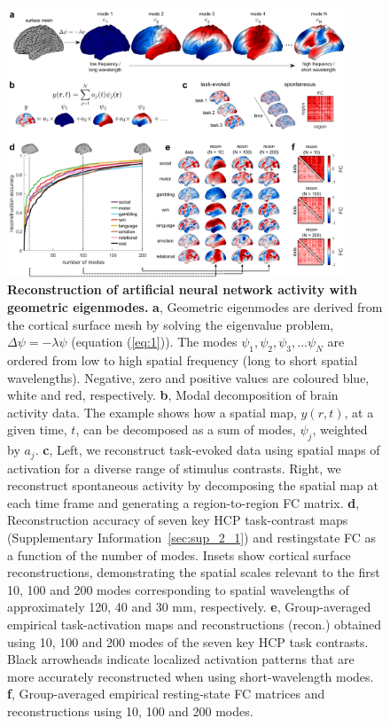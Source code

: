 \documentclass[sn-mathphys-num]{sn-jnl}%
\theoremstyle{thmstyleone}%
\theoremstyle{thmstyletwo}%
\theoremstyle{thmstylethree}%
\begin{document}
\begin{figure}[!htb]
	\centering
	\includegraphics[width=0.9\textwidth]{fig/fig_1.pdf}
	\caption{\textbf{Reconstruction of artificial neural network activity with geometric eigenmodes.}
	\textbf{a}, Geometric eigenmodes are derived from the cortical surface mesh by solving the eigenvalue problem,$ \Delta \psi = -\lambda \psi $ (equation (\ref{eq:1})). 
	The modes $ \psi_1, \psi_2, \psi_3, ... \psi_N $ are ordered from low to high spatial frequency (long to short spatial wavelengths). 
	Negative, zero and positive values are coloured blue, white and red, respectively.
	\textbf{b}, Modal decomposition of brain activity data. 
	The example shows how a spatial map, $ y(r,t) $, at a given time, $ t $, can be decomposed as a sum of modes, $ \psi_j $, weighted by $a_j$.
	\textbf{c}, Left, we reconstruct task-evoked data using spatial maps of activation for a diverse range of stimulus contrasts. 
	Right, we reconstruct spontaneous activity by decomposing the spatial map at each time frame and generating a region-to-region FC matrix.
	\textbf{d}, Reconstruction accuracy of seven key HCP task-contrast maps (Supplementary Information~\ref{sec:sup_2_1}) and restingstate FC as a function of the number of modes. 
	Insets show cortical surface reconstructions, demonstrating the spatial scales relevant to the first 10, 100 and 200 modes corresponding to spatial wavelengths of approximately 120, 40 and 30 mm, respectively.
	\textbf{e}, Group-averaged empirical task-activation maps and reconstructions (recon.) obtained using 10, 100 and 200 modes of the seven key HCP task contrasts. 
	Black arrowheads indicate localized activation patterns that are more accurately reconstructed when using short-wavelength modes. 
	\textbf{f}, Group-averaged empirical resting-state FC matrices and reconstructions using 10, 100 and 200 modes.
	} \label{fig:1}
\end{figure}
\end{document}
